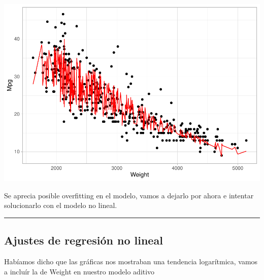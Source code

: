 \documentclass[
]{article}
\newenvironment{Shaded}{\begin{snugshade}}{\end{snugshade}}
\newcommand{\DataTypeTok}[1]{\textcolor[rgb]{0.13,0.29,0.53}{#1}}
\newcommand{\KeywordTok}[1]{\textcolor[rgb]{0.13,0.29,0.53}{\textbf{#1}}}
\newcommand{\NormalTok}[1]{#1}
\newcommand{\OperatorTok}[1]{\textcolor[rgb]{0.81,0.36,0.00}{\textbf{#1}}}
\newcommand{\StringTok}[1]{\textcolor[rgb]{0.31,0.60,0.02}{#1}}
\begin{document}
\begin{center}\includegraphics{Regresion_files/figure-latex/unnamed-chunk-16-1} \end{center}

Se aprecia posible overfitting en el modelo, vamos a dejarlo por ahora e
intentar solucionarlo con el modelo no lineal.

\begin{center}\rule{0.5\linewidth}{0.5pt}\end{center}

\hypertarget{ajustes-de-regresiuxf3n-no-lineal}{%
\subsection{Ajustes de regresión no
lineal}\label{ajustes-de-regresiuxf3n-no-lineal}}

Habíamos dicho que las gráficas nos mostraban una tendencia logarítmica,
vamos a incluír la de Weight en nuestro modelo aditivo

\begin{Shaded}
\end{Shaded}
\end{document}
